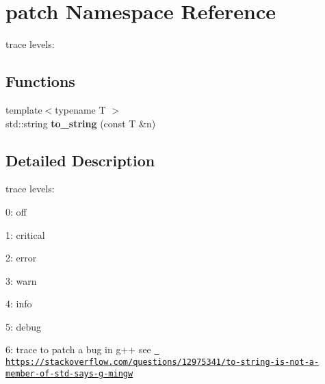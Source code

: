\hypertarget{namespacepatch}{}\section{patch Namespace Reference}
\label{namespacepatch}


trace levels\+:  


\subsection*{Functions}
\begin{DoxyCompactItemize}
\item 
\mbox{\label{namespacepatch_a54d2400c78aef13e3748a87cd7c86ede}} 
{\footnotesize template$<$typename T $>$ }\\std\+::string {\bfseries to\+\_\+string} (const T \&n)
\end{DoxyCompactItemize}


\subsection{Detailed Description}
trace levels\+: 


\begin{DoxyItemize}
\item 0\+: off
\item 1\+: critical
\item 2\+: error
\item 3\+: warn
\item 4\+: info
\item 5\+: debug
\item 6\+: trace to patch a bug in g++ see \href{https://stackoverflow.com/questions/12975341/to-string-is-not-a-member-of-std-says-g-mingw}{\texttt{ https\+://stackoverflow.\+com/questions/12975341/to-\/string-\/is-\/not-\/a-\/member-\/of-\/std-\/says-\/g-\/mingw}} 
\end{DoxyItemize}